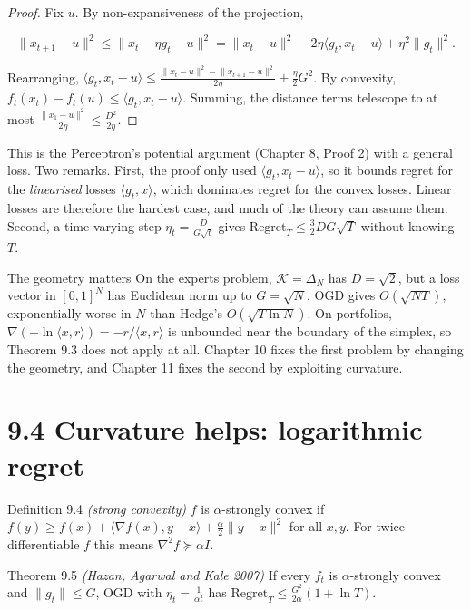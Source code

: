\documentclass[11pt,a4paper,openany]{book}
\newcommand{\Reg}{\mathrm{Regret}}
\newcommand{\ip}[2]{\langle #1,#2\rangle}
\newcommand{\norm}[1]{\lVert #1\rVert}
\newcommand{\simplex}{\Delta}
\newcommand{\cK}{\mathcal{K}}
\begin{document}
\begin{proof}
Fix $u$. By non-expansiveness of the projection,

\[\norm{x_{t+1}-u}^2\le\norm{x_t-\eta g_t-u}^2=\norm{x_t-u}^2-2\eta\ip{g_t}{x_t-u}+\eta^2\norm{g_t}^2.\]

Rearranging, $\ip{g_t}{x_t-u}\le\frac{\norm{x_t-u}^2-\norm{x_{t+1}-u}^2}{2\eta}+\frac\eta2G^2$. By convexity, $f_t(x_t)-f_t(u)\le\ip{g_t}{x_t-u}$. Summing, the distance terms telescope to at most $\frac{\norm{x_1-u}^2}{2\eta}\le\frac{D^2}{2\eta}$.
\end{proof}

This is the Perceptron's potential argument (Chapter 8, Proof 2) with a general loss. Two remarks. First, the proof only used $\ip{g_t}{x_t-u}$, so it bounds regret for the \emph{linearised} losses $\ip{g_t}{x}$, which dominates regret for the convex losses. Linear losses are therefore the hardest case, and much of the theory can assume them. Second, a time-varying step $\eta_t=\frac{D}{G\sqrt t}$ gives $\Reg_T\le\frac32DG\sqrt T$ without knowing $T$.

\begin{bwarn}{The geometry matters}
On the experts problem, $\cK=\simplex_N$ has $D=\sqrt2$, but a loss vector in $[0,1]^N$ has Euclidean norm up to $G=\sqrt N$. OGD gives $O(\sqrt{NT})$, exponentially worse in $N$ than Hedge's $O(\sqrt{T\ln N})$. On portfolios, $\nabla(-\ln\ip{x}{r})=-r/\ip{x}{r}$ is unbounded near the boundary of the simplex, so Theorem 9.3 does not apply at all. Chapter 10 fixes the first problem by changing the geometry, and Chapter 11 fixes the second by exploiting curvature.
\end{bwarn}

\section*{9.4 Curvature helps: logarithmic regret}\label{ch9-strong}

\begin{bdef}{Definition 9.4 \emph{(strong convexity)}}
$f$ is $\alpha$-strongly convex if $f(y)\ge f(x)+\ip{\nabla f(x)}{y-x}+\frac\alpha2\norm{y-x}^2$ for all $x,y$. For twice-differentiable $f$ this means $\nabla^2f\succeq\alpha I$.
\end{bdef}

\begin{bthm}{Theorem 9.5 \emph{(Hazan, Agarwal and Kale 2007)}}
If every $f_t$ is $\alpha$-strongly convex and $\norm{g_t}\le G$, OGD with $\eta_t=\frac1{\alpha t}$ has $\Reg_T\le\frac{G^2}{2\alpha}(1+\ln T)$.
\end{bthm}
\end{document}
